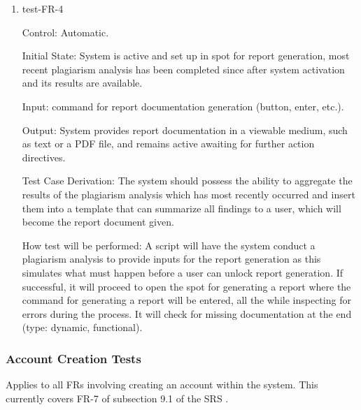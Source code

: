 \documentclass[12pt, titlepage]{article}
\begin{document}
\begin{enumerate}

\item{test-FR-4\\}

Control: Automatic.
					
Initial State: System is active and set up in spot for report generation, 
most recent plagiarism analysis has been completed since after system activation 
and its results are available.
					
Input: command for report documentation generation (button, enter, etc.).
					
Output: System provides report documentation in a viewable medium, such
as text or a PDF file, and remains active awaiting for further action 
directives.

Test Case Derivation: The system should possess the ability to aggregate
the results of the plagiarism analysis which has most recently occurred 
and insert them into a template that can summarize all findings to a user,
which will become the report document given.

How test will be performed: A script will have the system conduct a 
plagiarism analysis to provide inputs for the report generation as this
simulates what must happen before a user can unlock report generation. 
If successful, it will proceed to open the spot for generating a report 
where the command for generating a report will be entered, all the while 
inspecting for errors during the process. It will check for missing 
documentation at the end (type: dynamic, functional).			

\end{enumerate}

\subsubsection{Account Creation Tests}

Applies to all FRs involving creating an account within the system. This currently
covers FR-7 of subsection 9.1 of the SRS \citep{SRS}.
\end{document}
